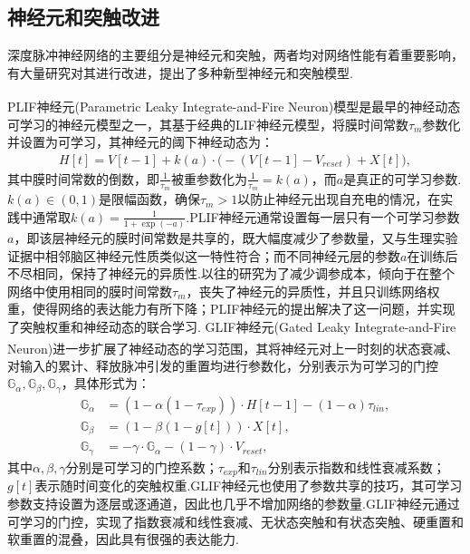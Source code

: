 \documentclass[10.5pt,compsoc,UTF8]{CjC}
\theoremstyle{mystyle}
\newcommand{\upcite}[1]{\textsuperscript{\cite{#1}}}
\begin{document}
\begin{multicols}{1}


\subsection{神经元和突触改进}%
深度脉冲神经网络的主要组分是神经元和突触，两者均对网络性能有着重要影响，有大量研究对其进行改进，提出了多种新型神经元和突触模型.

PLIF神经元(Parametric Leaky Integrate-and-Fire Neuron)模型\upcite{fang2021incorporating}是最早的神经动态可学习的神经元模型之一，其基于经典的LIF神经元模型，将膜时间常数$\tau_{m}$参数化并设置为可学习，其神经元的阈下神经动态为：
\begin{eqnarray}
	H[t] = V[t-1] + k(a)\cdot\Big(-(V[t-1] - V_{reset}) + X[t]\Big), \label{eq, plif charge}
\end{eqnarray}
其中膜时间常数的倒数，即$\frac{1}{\tau_{m}}$被重参数化为$\frac{1}{\tau_{m}}=k(a)$，而$a$是真正的可学习参数.$k(a)\in (0, 1)$是限幅函数，确保$\tau_{m} > 1$以防止神经元出现自充电的情况，在实践中通常取$k(a) = \frac{1}{1 + \exp(-a)}$.PLIF神经元通常设置每一层只有一个可学习参数$a$，即该层神经元的膜时间常数是共享的，既大幅度减少了参数量，又与生理实验证据中相邻脑区神经元性质类似这一特性符合；而不同神经元层的参数$a$在训练后不尽相同，保持了神经元的异质性.以往的研究为了减少调参成本，倾向于在整个网络中使用相同的膜时间常数$\tau_{m}$，丧失了神经元的异质性，并且只训练网络权重，使得网络的表达能力有所下降；PLIF神经元的提出解决了这一问题，并实现了突触权重和神经动态的联合学习.
GLIF神经元(Gated Leaky Integrate-and-Fire
Neuron)\upcite{yao2022glif}进一步扩展了神经动态的学习范围，其将神经元对上一时刻的状态衰减、对输入的累计、释放脉冲引发的重置均进行参数化，分别表示为可学习的门控$\mathbb{G}_{\alpha}, \mathbb{G}_{\beta}, \mathbb{G}_{\gamma}$，具体形式为：
\begin{align}
	\mathbb{G}_{\alpha} &= (1 - \alpha (1 - \tau_{exp})) \cdot H[t-1] - (1 - \alpha)\tau_{lin}, \\
	\mathbb{G}_{\beta} &= (1 - \beta (1 - g[t])) \cdot X[t], \\
	\mathbb{G}_{\gamma} &= -\gamma \cdot \mathbb{G}_{\alpha} - (1 - \gamma) \cdot V_{reset},
\end{align}
其中$\alpha, \beta, \gamma$分别是可学习的门控系数；$\tau_{exp}$和$\tau_{lin}$分别表示指数和线性衰减系数；$g[t]$表示随时间变化的突触权重.GLIF神经元也使用了参数共享的技巧，其可学习参数支持设置为逐层或逐通道，因此也几乎不增加网络的参数量.GLIF神经元通过可学习的门控，实现了指数衰减和线性衰减、无状态突触和有状态突触、硬重置和软重置的混叠，因此具有很强的表达能力.

\end{multicols}
\end{document}
